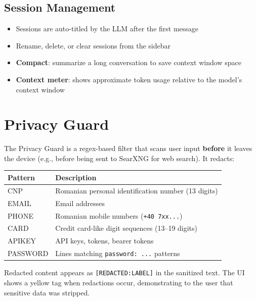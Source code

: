 \documentclass[a4paper,11pt,twoside]{report}
\begin{document}
\section{Session Management}
\begin{itemize}
  \item Sessions are auto-titled by the LLM after the first message
  \item Rename, delete, or clear sessions from the sidebar
  \item \textbf{Compact}: summarize a long conversation to save context window space
  \item \textbf{Context meter}: shows approximate token usage relative to the model's context window
\end{itemize}

\chapter{Privacy Guard}

The Privacy Guard is a regex-based filter that scans user input \textbf{before} it leaves the device (e.g., before being sent to SearXNG for web search). It redacts:

\begin{center}\small
\begin{tabular}{@{}ll@{}}
\toprule
\textbf{Pattern} & \textbf{Description} \\
\midrule
CNP & Romanian personal identification number (13 digits) \\
EMAIL & Email addresses \\
PHONE & Romanian mobile numbers (\texttt{+40 7xx...}) \\
CARD & Credit card-like digit sequences (13--19 digits) \\
APIKEY & API keys, tokens, bearer tokens \\
PASSWORD & Lines matching \texttt{password: ...} patterns \\
\bottomrule
\end{tabular}
\end{center}

Redacted content appears as \texttt{[REDACTED:LABEL]} in the sanitized text. The UI shows a yellow tag when redactions occur, demonstrating to the user that sensitive data was stripped.

\end{document}

